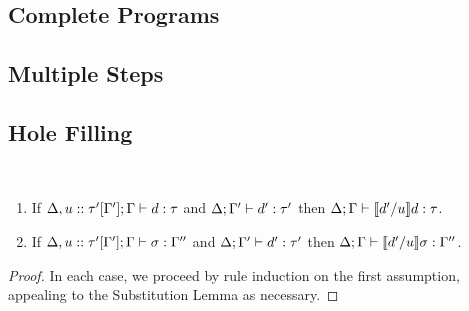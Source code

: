 

\subsection{Complete Programs}



\subsection{Multiple Steps}


\clearpage
\subsection{Hole Filling}\label{sec:hole-filling}
\begin{lem}[Filling] ~
  \begin{enumerate}[nolistsep]
  \item If $\Delta, u :: \tau'[\Gamma']; \Gamma \vdash d : \tau$
  and $\Delta; \Gamma' \vdash d' : \tau'$
  then $\Delta; \Gamma \vdash \llbracket d' / u\rrbracket d : \tau$.
  \item If $\Delta, u :: \tau'[\Gamma']; \Gamma \vdash \sigma : \Gamma''$
  and $\Delta; \Gamma' \vdash d' : \tau'$
  then $\Delta; \Gamma \vdash \llbracket d' / u\rrbracket \sigma : \Gamma''$.
  \end{enumerate}
\end{lem}
\begin{proof}
In each case, we proceed by rule induction on the first assumption, appealing to the Substitution Lemma as necessary.
\end{proof}

